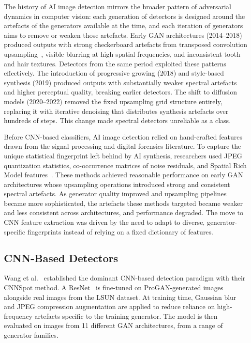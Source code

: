 The history of AI image detection mirrors the broader pattern of adversarial dynamics in
computer vision: each generation of detectors is designed around the artefacts of the
generators available at the time, and each iteration of generators aims to remove or weaken
those artefacts. Early GAN architectures (2014--2018) produced outputs with strong
checkerboard artefacts from transposed convolution upsampling~\cite{odena2016deconvolution}, visible blurring at
high spatial frequencies, and inconsistent tooth and hair textures. Detectors from the
same period exploited these patterns effectively. The introduction of progressive growing
(2018) and style-based synthesis (2019) produced outputs with substantially weaker
spectral artefacts and higher perceptual quality, breaking earlier detectors. The shift
to diffusion models (2020--2022) removed the fixed upsampling grid structure entirely,
replacing it with iterative denoising that distributes synthesis artefacts over hundreds
of steps. This change made spectral detectors unreliable as a class.

Before CNN-based classifiers, AI image detection relied on hand-crafted features drawn
from the signal processing and digital forensics literature. To capture the unique statistical 
fingerprint left behind by AI synthesis, researchers used JPEG quantization statistics, 
co-occurrence matrices of noise residuals, and Spatial Rich Model features~\cite{fridrich2012rich}. 
These methods achieved reasonable performance on early GAN architectures whose upsampling operations introduced
strong and consistent spectral artefacts. As generator quality improved and upsampling
pipelines became more sophisticated, the artefacts these methods targeted became weaker
and less consistent across architectures, and performance degraded. The move to CNN feature 
extraction was driven by the need to adapt to diverse, generator-specific fingerprints instead 
of relying on a fixed dictionary of features.

\subsection{CNN-Based Detectors}
\label{subsec:cnn_detectors}

Wang et al.~\cite{wang2020} established the dominant CNN-based detection paradigm with
their CNNSpot method. A ResNet~\cite{he2016} is fine-tuned on ProGAN-generated images
alongside real images from the LSUN dataset. At training time, Gaussian blur and JPEG
compression augmentation are applied to reduce reliance on high-frequency artefacts
specific to the training generator. The model is then evaluated on images from 11
different GAN architectures, from a range of generator families.

